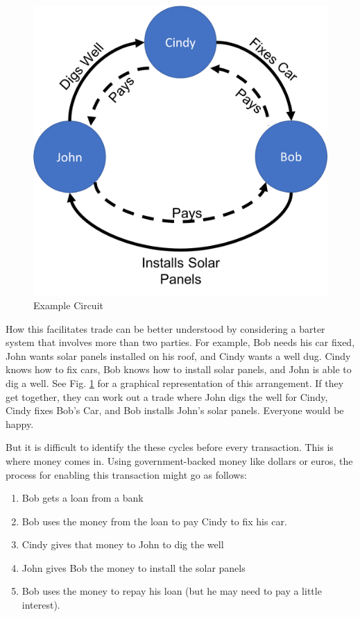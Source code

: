 \documentclass[runningheads]{llncs}
\begin{document}
\begin{figure}[h]
    \centering
    \includegraphics[scale=0.3]{ExampleCircuit.png}
    \caption{Example Circuit}
    \label{fig:liftProt}
\end{figure}
How this facilitates trade can be better understood by considering a barter system that involves more than two parties. 
For example, Bob needs his car fixed, John wants solar panels installed on his roof, and Cindy wants a well dug. Cindy knows how to fix cars, Bob knows how to install solar panels, and John is able to dig a well. See Fig. \ref{fig:liftProt} for a graphical representation of this arrangement. If they get together, they can work out a trade where John digs the well for Cindy, Cindy fixes Bob's Car, and Bob installs John's solar panels. Everyone would be happy.

But it is difficult to identify the these cycles before every transaction. This is where money comes in. Using government-backed money like dollars or euros, the process for enabling this transaction might go as follows:
\begin{enumerate}
\item Bob gets a loan from a bank
\item Bob uses the money from the loan to pay Cindy to fix his car.
\item Cindy gives that money to John to dig the well
\item John gives Bob the money to install the solar panels
\item Bob uses the money to repay his loan (but he may need to pay a little 
interest).
\end{enumerate}
\end{document}
